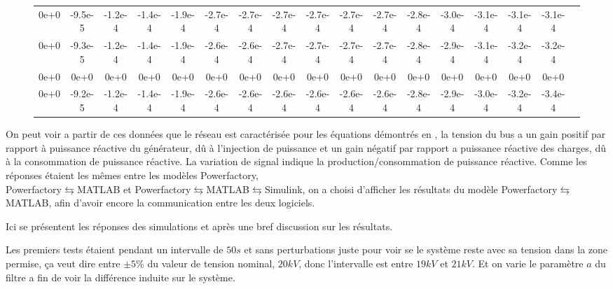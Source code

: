 \begin{sidewaysfigure}
\begin{table}[H]
{\begin{tabular}{ccccccccccccccccc}
				0e+0& -9.5e-5& -1.2e-4& -1.4e-4& -1.9e-4& -2.7e-4& -2.7e-4& -2.7e-4& -2.7e-4& -2.7e-4& -2.7e-4& -2.8e-4& -3.0e-4& -3.1e-4& -3.1e-4& -3.1e-4\\
				0e+0& -9.3e-5& -1.2e-4& -1.4e-4& -1.9e-4& -2.6e-4& -2.6e-4& -2.7e-4& -2.7e-4& -2.7e-4& -2.7e-4& -2.8e-4& -2.9e-4& -3.1e-4& -3.2e-4& -3.2e-4\\
				0e+0& 0e+0& 0e+0& 0e+0& 0e+0& 0e+0& 0e+0& 0e+0& 0e+0& 0e+0& 0e+0& 0e+0& 0e+0& 0e+0& 0e+0& 0e+0\\
				0e+0& -9.2e-5& -1.2e-4& -1.4e-4& -1.9e-4& -2.6e-4& -2.6e-4& -2.6e-4& -2.6e-4& -2.6e-4& -2.6e-4& -2.8e-4& -2.9e-4& -3.0e-4& -3.2e-4& -3.4e-4
				\\
		\end{tabular}}
	\end{table} 
	
\end{sidewaysfigure}
\vspace{2em}
On peut voir a partir de ces données que le réseau est caractérisée pour les équations démontrés en \cite{cosson:tel-01374469}, la tension du bus a un gain positif par rapport à puissance réactive du générateur,  dû à l'injection de puissance et un gain négatif par rapport a puissance réactive des charges, dû à la consommation de puissance réactive. La variation de signal indique la production/consommation de puissance réactive.
\newpage
{}
Comme les réponses étaient les mêmes entre les modèles Powerfactory,\\ Powerfactory$ \leftrightarrows $MATLAB et Powerfactory$ \leftrightarrows $MATLAB$ \leftrightarrows $Simulink, on a choisi d'afficher les résultats du modèle Powerfactory$ \leftrightarrows $MATLAB, afin d'avoir encore la communication entre les deux logiciels.

 Ici se présentent les réponses des simulations et après une bref discussion sur les résultats.
 
 Les premiers tests étaient pendant un intervalle de $ 50s $ et sans perturbations juste pour voir se le système reste avec sa tension dans la zone permise, ça veut dire entre $ \pm 5\% $ du valeur de tension nominal, $ 20kV $, donc l'intervalle est entre $ 19kV $ et $ 21kV $. Et on varie le paramètre $ a $ du filtre a fin de voir la différence induite sur le système.
 
